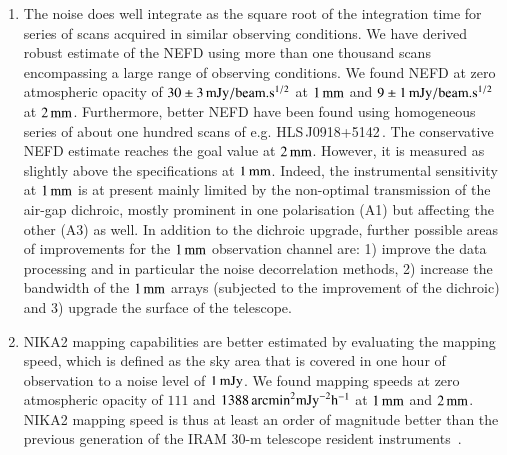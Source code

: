 \documentclass[traditionalabstract]{aa}
\newcommand{\hls}{HLS\,J0918+5142}
\begin{document}
\begin{enumerate}
\item %
  The noise does well integrate as the square root of the integration time
  for series of scans acquired in similar observing conditions. We
  have derived robust estimate of the NEFD using more than one
  thousand scans encompassing a large range of observing
  conditions. We found NEFD at zero atmospheric opacity of
  $30 \pm 3\,\rm{mJy}/{beam}.s^{1/2}$ at
  $1\, \rm{mm}$ and $9 \pm 1\,\rm{mJy}/{beam}.s^{1/2}$ at $2\, \rm{mm}$.
  Furthermore, better NEFD have been found using homogeneous series of
  about one hundred scans of e.g. \hls\,. The conservative NEFD
  estimate reaches the goal value at $2\,\rm{mm}$. However, it is
  measured as slightly above the specifications at
  $1\,\rm{mm}$. Indeed, the instrumental sensitivity at $1\,\rm{mm}$
  is at present mainly limited by the non-optimal transmission of
  the air-gap dichroic, mostly prominent in one polarisation (A1) but
  affecting the other (A3) as well.
  In addition to the dichroic upgrade, further possible areas of
  improvements for the $1\,\rm{mm}$ observation channel are: 1)
  improve the data processing and in particular the noise
  decorrelation methods, 2) increase the bandwidth of the $1\,\rm{mm}$
  arrays (subjected to the improvement of the dichroic) and 3)
  upgrade the surface of the telescope.
  
\item  NIKA2 mapping capabilities are better estimated by evaluating the
  mapping speed, which is defined as the sky area that is covered in one
  hour of observation to a noise level of $1\,\rm{mJy}$. We found
  mapping speeds at zero atmospheric opacity of $111$ and
  $1388\, \rm{arcmin}^2 \rm{mJy}^{-2} h^{-1}$ at
  $1\, \rm{mm}$ and  $2\, \rm{mm}$. NIKA2 mapping speed is thus at
  least an order of magnitude better than the previous generation of the IRAM
 30-m telescope resident instruments~\citep{Catalano2014, Staguhn2011_GISMO, Kreysa1999}.
  
\end{enumerate}
\end{document}
